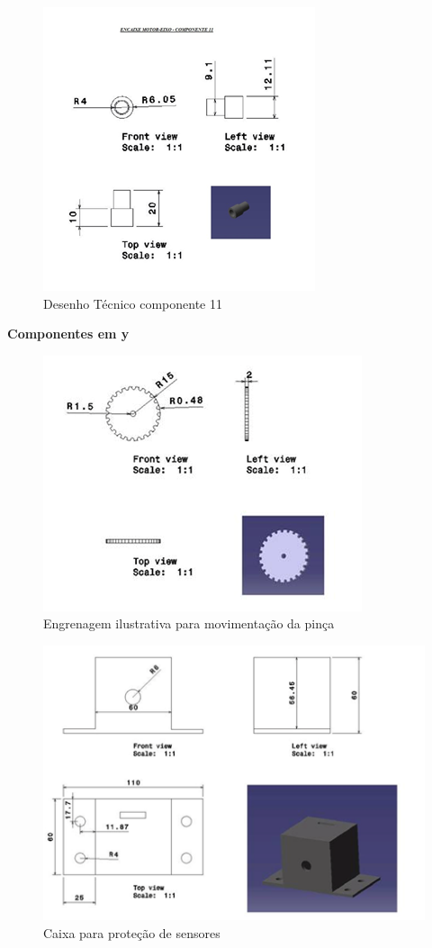 \begin{apendicesenv}
\begin{figure}[H]
    \centering
      \includegraphics[scale=1.0]{figuras/tec11.png}
    \caption{Desenho Técnico componente 11}
    \label{tec11}
\end{figure}

\textbf{Componentes em y}

\begin{figure}[H]
    \centering
      \includegraphics[scale=1.0]{figuras/tec12.png}
    \caption{Engrenagem ilustrativa para movimentação da pinça}
    \label{tec12}
\end{figure}

\begin{figure}[H]
    \centering
      \includegraphics[scale=1.0]{figuras/tec13.png}
    \caption{Caixa para proteção de sensores}
    \label{tec13}
\end{figure}


\end{apendicesenv}
